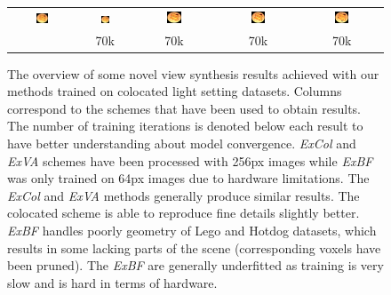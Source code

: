 \begin{figure}[!htb]
\begin{tabular*}{\textwidth}{ c c c c c }
        \includegraphics[width=0.19\textwidth]{figures/results/col_set/hotdog2_targ_256px.png}
        &
        \includegraphics[width=0.19\textwidth]{figures/results/col_set/hotdog2_imnf_91k.png}
        &
        \includegraphics[width=0.19\textwidth]{figures/results/col_set/hotdog2_excol_150k.png}
        &
        \includegraphics[width=0.19\textwidth]{figures/results/col_set/hotdog2_exva_67k.png}
        &
        \includegraphics[width=0.19\textwidth]{figures/results/col_set/hotdog2_exbf_68k.png}
        \\ [-5pt]
        & 70k & 70k & 70k & 70k \\
        

    \end{tabular*}
    \caption{The overview of some novel view synthesis results achieved with our methods trained on colocated light setting datasets.
    Columns correspond to the schemes that have been used to obtain results.
    The number of training iterations is denoted below each result to have better understanding about model convergence.
    \textit{ExCol} and \textit{ExVA} schemes have been processed with 256px images
    while \textit{ExBF} was only trained on 64px images due to hardware limitations.
    The \textit{ExCol} and \textit{ExVA} methods generally produce similar results.
    The colocated scheme is able to reproduce fine details slightly better.
    \textit{ExBF} handles poorly geometry of Lego and Hotdog datasets,
    which results in some lacking parts of the scene
    (corresponding voxels have been pruned).
    The \textit{ExBF} are generally underfitted as training is very slow and is hard in terms of hardware.
    }
    \label{tab:coloc_allresults}
\end{figure}
\endgroup